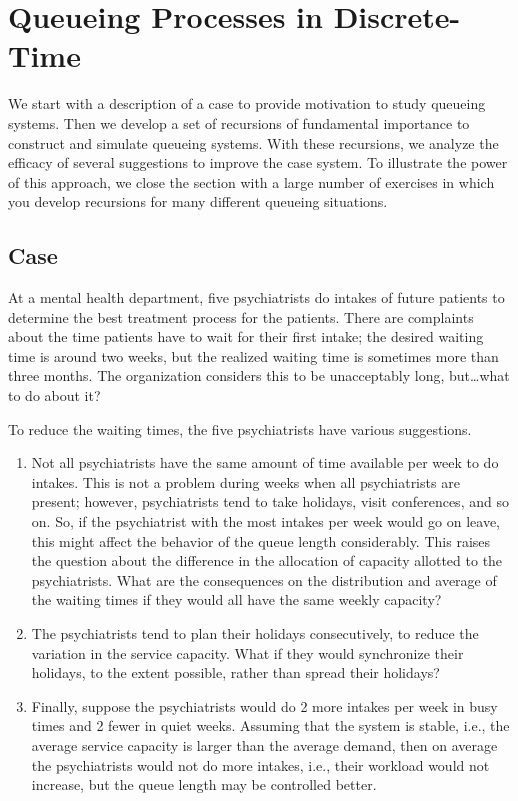 \section{Queueing Processes in Discrete-Time}
\label{sec:constr-discr-time}



We start with a description of a case to provide motivation to study queueing systems.
Then we develop a set of recursions of fundamental importance to construct and simulate queueing systems.
With these recursions, we analyze the efficacy of several suggestions to improve the case system.
To illustrate the power of this approach, we close the section with a large number of exercises in which you develop recursions for many different queueing situations.

\subsection*{Case}
\label{sec:case}

At a mental health department, five psychiatrists do intakes of future patients to determine the best treatment process for the patients.
There are complaints about the time patients have to wait for their first intake; the desired waiting time is around two weeks, but the realized waiting time is sometimes more than three months.
The organization considers this to be unacceptably long, but\ldots what to do about it?

To reduce the waiting times, the five psychiatrists have various
suggestions. 
\begin{enumerate}
\item Not all psychiatrists have the same amount of time available per week to do intakes.
 This is not a problem during weeks when all psychiatrists are present; however, psychiatrists tend to take holidays, visit conferences, and so on.
 So, if the psychiatrist with the most intakes per week would go on leave, this might affect the behavior of the queue length considerably.
 This raises the question about the difference in the allocation of capacity allotted to the psychiatrists.
 What are the consequences on the distribution and average of the waiting times if they would all have the same weekly capacity?
\item The psychiatrists tend to plan their holidays consecutively, to reduce the variation in the service capacity.
 What if they would synchronize their holidays, to the extent possible, rather than spread their holidays?
\item Finally, suppose the psychiatrists would do 2 more intakes per week in busy times and 2 fewer in quiet weeks.
 Assuming that the system is stable, i.e., the average service capacity is larger than the average demand, then on average the psychiatrists would not do more intakes, i.e., their workload would not increase, but the queue length may be controlled better.
\end{enumerate}


